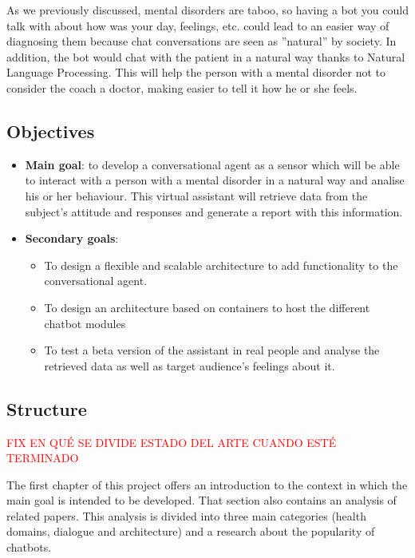 \documentclass[12pt,english]{article}
\begin{document}
As we previously discussed, mental disorders are taboo, so having a bot you could talk with about how was your day, feelings, etc. could lead to an easier way of diagnosing them because chat conversations are seen as ''natural'' by society. In addition, the bot would chat with the patient in a natural way thanks to Natural Language Processing. This will help the person with a mental disorder not to consider the coach a doctor, making easier to tell it how he or she feels.

\newpage

\subsection{Objectives}

\begin{itemize}
  \item \textbf{Main goal}: to develop a conversational agent as a sensor which will be able to interact with a person with a mental disorder in a natural way and analise his or her behaviour. This virtual assistant will retrieve data from the subject's attitude and responses and generate a report with this information.
  \item \textbf{Secondary goals}:
    \begin{itemize}
      \item To design a flexible and scalable architecture to add functionality to the conversational agent.
      \item To design an architecture based on containers to host the different chatbot modules
      \item To test a beta version of the assistant in real people and analyse the retrieved data as well as target audience's feelings about it.
    \end{itemize}
\end{itemize}

\subsection{Structure}
\textcolor{red}{FIX EN QUÉ SE DIVIDE ESTADO DEL ARTE CUANDO ESTÉ TERMINADO}

The first chapter of this project offers an introduction to the context in which the main goal is intended to be developed. That section also contains an analysis of related papers. This analysis is divided into three main categories (health domains, dialogue and architecture) and a research about the popularity of chatbots.\\
\end{document}
